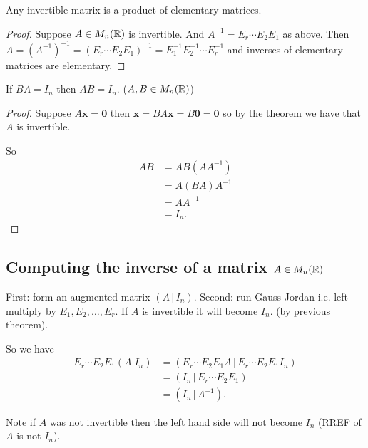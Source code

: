 \documentclass[10pt, a4paper]{article}
\newcommand{\mbf}[1]{\mathbf{#1}}
\begin{document}
\begin{corollary}
    Any invertible matrix is a product of elementary matrices.
    \begin{proof}
        Suppose $A \in M_n(\mathbb{R})$ is invertible.
        And $A ^ {-1} = E_r \dotsi E_2E_1$ as above.
        Then $A = (A ^ {-1}) ^ {-1} = (E_r\dotsi E_2E_1) ^ {-1} = E_1^{-1}E_2^{-1}\dotsi E_r^{-1}$
        and inverses of elementary matrices are elementary.
    \end{proof}
\end{corollary}

\begin{corollary}
    If $BA = I_n$ then $AB = I_n$. ($A, B \in M_n(\mathbb{R})$)
    \begin{proof}
        Suppose $A\mbf{x} = \mbf{0}$ then $\mbf{x} = BA\mbf{x} = B\mbf{0} = \mbf{0}$ so by the theorem we have that $A$ is invertible.

        So
        \begin{align*}
            AB &= AB(AA ^ {-1}) \\
            &= A(BA)A ^ {-1} \\
            &= AA ^ {-1} \\
            &= I_n.
        \end{align*}
    \end{proof}
\end{corollary}

\subsection{Computing the inverse of a matrix \texorpdfstring{$A \in M_n(\mathbb{R})$}{}}
First:
form an augmented matrix $(A\,|\,I_n)$.
Second: run Gauss-Jordan i.e. left multiply by $E_1, E_2, \dotsc, E_r$.
If $A$ is invertible it will become $I_n$. (by previous theorem).

So we have
\begin{align*}
    E_r \dotsi E_2 E_1 (A | I_n) &= (E_r\dotsi E_2E_1A\,|\,E_r\dotsi E_2E_1I_n) \\
    &= (I_n\,|\,E_r\dotsi E_2E_1) \\
    &= (I_n\,|\,A ^ {-1}).
\end{align*}

Note if $A$ was not invertible then the left hand side will not become $I_n$ (RREF of $A$ is not $I_n$).
\end{document}
